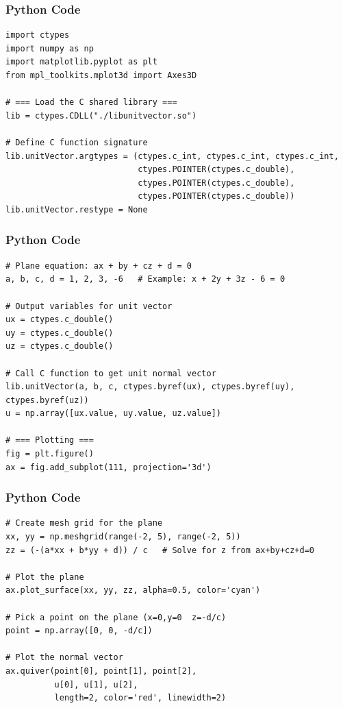 \documentclass{beamer}
\begin{document}
\begin{frame}[fragile]
\frametitle{Python Code}
   \begin{lstlisting}
import ctypes
import numpy as np
import matplotlib.pyplot as plt
from mpl_toolkits.mplot3d import Axes3D

# === Load the C shared library ===
lib = ctypes.CDLL("./libunitvector.so")

# Define C function signature
lib.unitVector.argtypes = (ctypes.c_int, ctypes.c_int, ctypes.c_int,
                           ctypes.POINTER(ctypes.c_double),
                           ctypes.POINTER(ctypes.c_double),
                           ctypes.POINTER(ctypes.c_double))
lib.unitVector.restype = None

   \end{lstlisting}
\end{frame}

\begin{frame}[fragile]
\frametitle{Python Code}
   \begin{lstlisting}
# Plane equation: ax + by + cz + d = 0
a, b, c, d = 1, 2, 3, -6   # Example: x + 2y + 3z - 6 = 0

# Output variables for unit vector
ux = ctypes.c_double()
uy = ctypes.c_double()
uz = ctypes.c_double()

# Call C function to get unit normal vector
lib.unitVector(a, b, c, ctypes.byref(ux), ctypes.byref(uy), ctypes.byref(uz))
u = np.array([ux.value, uy.value, uz.value])

# === Plotting ===
fig = plt.figure()
ax = fig.add_subplot(111, projection='3d')

\end{lstlisting}
\end{frame}

\begin{frame}[fragile]
\frametitle{Python Code}
   \begin{lstlisting}
# Create mesh grid for the plane
xx, yy = np.meshgrid(range(-2, 5), range(-2, 5))
zz = (-(a*xx + b*yy + d)) / c   # Solve for z from ax+by+cz+d=0

# Plot the plane
ax.plot_surface(xx, yy, zz, alpha=0.5, color='cyan')

# Pick a point on the plane (x=0,y=0  z=-d/c)
point = np.array([0, 0, -d/c])

# Plot the normal vector
ax.quiver(point[0], point[1], point[2],
          u[0], u[1], u[2],
          length=2, color='red', linewidth=2)
 \end{lstlisting}
\end{frame}  
\end{document}
